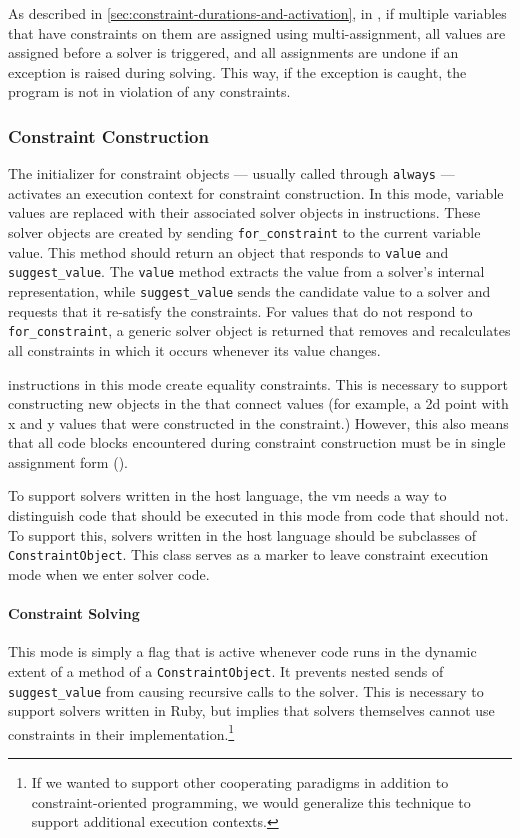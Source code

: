 As described in \autoref{sec:constraint-durations-and-activation}, in
\toolname, if multiple variables that have constraints on them are
assigned using multi-assignment, all values are assigned before a
solver is triggered, and all assignments are undone if an exception is
raised during solving. This way, if the exception is caught, the
program is not in violation of any constraints.

\subsubsection{Constraint Construction}
The initializer for constraint objects --- usually called through
\lstinline{always} --- activates an execution context for constraint
construction. In this mode, variable values are replaced with their
associated solver objects in \load instructions. These solver objects
are created by sending \lstinline{for_constraint} to the current
variable value. This method should return an object that
responds to \lstinline{value} and \lstinline{suggest_value}. 
The \lstinline{value} method extracts the value from a solver's
internal representation, while \lstinline{suggest_value} sends the
candidate value to a solver and requests that it re-satisfy the 
constraints.  For values that do not respond to
\lstinline{for_constraint}, a generic solver object is returned that removes 
and recalculates all constraints in which it occurs whenever its value
changes.

\store instructions in this mode create equality constraints. This is
necessary to support constructing new objects in the \DIFdelbegin {}\DIFdelend \DIFaddbegin {}\DIFaddend that
connect values (for example, a 2d point with x and y values that were
constructed in the constraint.) However, this also means that all code
blocks encountered during constraint construction must be in single
assignment form ().

To support solvers written in the host language, the \ac{vm} needs a
way to distinguish code that should be executed in this mode from code
that should not.  To support this, solvers written in the host
language should be subclasses of \lstinline{ConstraintObject}.  This
class serves as a marker to leave constraint execution mode when we
enter solver code.

\paragraph{Constraint Solving}
This mode is simply a flag that is active whenever code runs in the
dynamic extent of a method of a \lstinline{ConstraintObject}. It
prevents nested sends of \lstinline{suggest_value} from causing
recursive calls to 
the solver. This is necessary to support solvers written in
Ruby, but implies that solvers themselves cannot use constraints in
their implementation.\footnote{If we wanted to support other
  cooperating paradigms in addition to constraint-oriented
  programming, we would generalize this technique to support additional
  execution contexts.}

